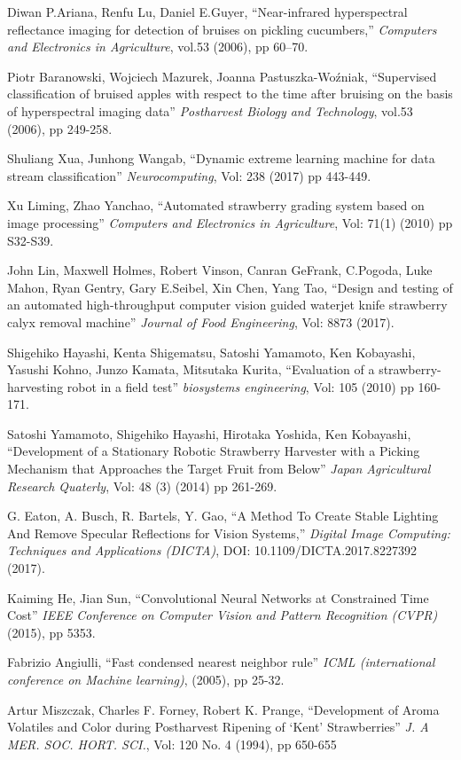 \documentclass{bmvc2k}
\begin{document}
\begin{thebibliography}{1}
	Diwan P.Ariana, Renfu Lu, Daniel E.Guyer, ``Near-infrared hyperspectral reflectance imaging for detection of bruises on pickling cucumbers,'' {\em Computers and Electronics in Agriculture}, vol.53 (2006), pp 60–70.
	
	Piotr Baranowski, Wojciech Mazurek, Joanna Pastuszka-Woźniak, ``Supervised classification of bruised apples with respect to the time after bruising on the basis of hyperspectral imaging data'' {\em Postharvest Biology and Technology}, vol.53 (2006), pp 249-258.
	
	Shuliang Xua, Junhong Wangab, ``Dynamic extreme learning machine for data stream classification'' {\em Neurocomputing}, Vol: 238 (2017) pp 443-449.
	
	Xu Liming, Zhao Yanchao, ``Automated strawberry grading system based on image processing'' {\em Computers and Electronics in Agriculture}, Vol: 71(1) (2010) pp S32-S39.
	
	John Lin, Maxwell Holmes, Robert Vinson, Canran GeFrank, C.Pogoda, Luke Mahon, Ryan Gentry, Gary E.Seibel, Xin Chen, Yang Tao, ``Design and testing of an automated high-throughput computer vision guided waterjet knife strawberry calyx removal machine'' {\em Journal of Food Engineering}, Vol: 8873 (2017).
	
	Shigehiko Hayashi, Kenta Shigematsu, Satoshi Yamamoto, Ken Kobayashi, Yasushi Kohno, Junzo Kamata, Mitsutaka Kurita, ``Evaluation of a strawberry-harvesting robot in a field test'' {\em biosystems engineering}, Vol: 105 (2010) pp 160-171.
	
	Satoshi Yamamoto, Shigehiko Hayashi, Hirotaka Yoshida, Ken Kobayashi, ``Development of a Stationary Robotic Strawberry Harvester with a Picking Mechanism that Approaches the Target Fruit from Below'' {\em Japan Agricultural Research Quaterly}, Vol: 48 (3) (2014) pp 261-269.
	
	G. Eaton, A. Busch, R. Bartels, Y. Gao, ``A Method To Create Stable Lighting And Remove Specular Reflections for Vision Systems,'' {\em Digital Image Computing: Techniques and Applications (DICTA)}, DOI: 10.1109/DICTA.2017.8227392 (2017).
	
	Kaiming He, Jian Sun, ``Convolutional Neural Networks at Constrained Time Cost'' {\em IEEE Conference on Computer Vision and Pattern Recognition (CVPR)} (2015), pp 5353.
	
	Fabrizio Angiulli, ``Fast condensed nearest neighbor rule'' {\em ICML (international conference on Machine learning)}, (2005), pp 25-32.
	
	Artur Miszczak,  Charles F. Forney, Robert K. Prange, ``Development of Aroma Volatiles and Color during Postharvest Ripening of ‘Kent’ Strawberries'' {\em J. A	MER. SOC. HORT. SCI.}, Vol: 120 No. 4 (1994), pp 650-655
	
\end{thebibliography}



\end{document}
